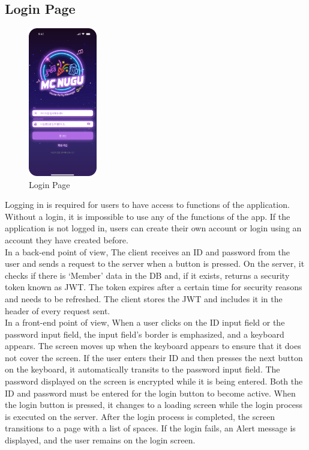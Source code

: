 \documentclass[conference]{IEEEtran}
\begin{document}
    \subsection{Login Page}
        \begin{figure}[htbp]
        \centerline{\includegraphics[width=3cm]{Images/screen/1_Login.png}}
        \label{fig}
        \caption{Login Page}
        \end{figure}
        Logging in is required for users to have access to functions of the application. Without a login, it is impossible to use any of the functions of the app. If the application is not logged in, users can create their own account or login using an account they have created before. \\
        In a back-end point of view, The client receives an ID and password from the user and sends a request to the server when a button is pressed. On the server, it checks if there is ‘Member’ data in the DB and, if it exists, returns a security token known as JWT. The token expires after a certain time for security reasons and needs to be refreshed.  The client stores the JWT and includes it in the header of every request sent. \\
        In a front-end point of view, When a user clicks on the ID input field or the password input field, the input field's border is emphasized, and a keyboard appears. The screen moves up when the keyboard appears to ensure that it does not cover the screen.  If the user enters their ID and then presses the next button on the keyboard, it automatically transits to the password input field. The password displayed on the screen is encrypted while it is being entered.  Both the ID and password must be entered for the login button to become active. When the login button is pressed, it changes to a loading screen while the login process is executed on the server. After the login process is completed, the screen transitions to a page with a list of spaces. If the login fails, an Alert message is displayed, and the user remains on the login screen.
\end{document}
